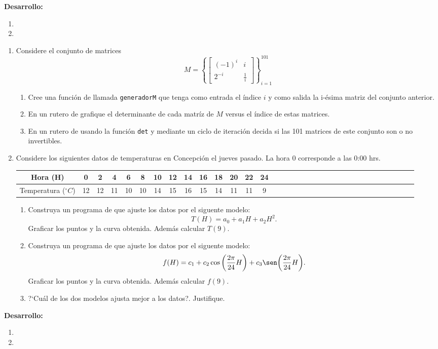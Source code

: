 \documentclass[letter,11pt]{article}
\begin{document}
\textbf{Desarrollo:}
\begin{enumerate}
    \item 
    \item
\end{enumerate}

\begin{enumerate}

\item Considere el conjunto de matrices
$$
M=\left\{
\begin{bmatrix}
(-1)^i & i \\
2^{-i} & \frac{1}{i}
\end{bmatrix}
\right\}_{i=1}^{101}
$$
\begin{enumerate}
    \item {} Cree una funci\'on de \octave llamada \texttt{generadorM} que tenga como entrada el \'indice $i$ y como salida la i-\'esima matriz del conjunto anterior.
    \item {} En un rutero de \octave grafique el determinante de cada matr\'iz de $M$ versus el \'indice de estas matrices.
    \item {} En un rutero de \octave usando la funci\'on \texttt{det} y mediante un ciclo de iteraci\'on decida si las 101 matrices de este conjunto son o no invertibles.
\end{enumerate}

\item
Considere los siguientes datos de temperaturas en Concepci\'on  el jueves pasado.
La hora $0$ corresponde a las 0:00 hrs.
\begin{center}
\begin{tabular}{c|ccccccccccccccccccccccccccccccccc}
Hora (H) & 0 & 2 & 4 & 6 & 8 &10 &12 &14 &16 &18 &20 &22 &24 \\
\hline 
Temperatura ($^\circ C$)
& 12 & 12 & 11 &10 &10 &14 &15 & 16 &15 &14 &11& 11 & 9
\end{tabular}
\end{center}

\begin{enumerate}
    \item  {} Construya un programa de \octave  que ajuste los datos por el siguente modelo:
    $$
    \displaystyle T(H) =  a_0 + a_1 H + a_2H^2.
    $$
    Graficar los puntos y la curva obtenida.  Adem\'as calcular $T(9)$.
    \item  {}  Construya un programa de \octave  que ajuste los datos por el siguente modelo:
    $$
    \displaystyle f(H) =  c_1 + c_2 \cos\bigg(\frac{2\pi}{24} H\bigg) + c_3 \sen\bigg(\frac{2\pi}{24} H\bigg).
    $$
    Graficar los puntos y la curva obtenida.  Adem\'as calcular $f(9)$.
    \item  {} ?`Cu\'al de los dos modelos ajusta mejor a los datos?. Justifique.
\end{enumerate}
\end{enumerate}
\textbf{Desarrollo:}
\begin{enumerate}
    \item 
    \item
\end{enumerate}
\end{document}
